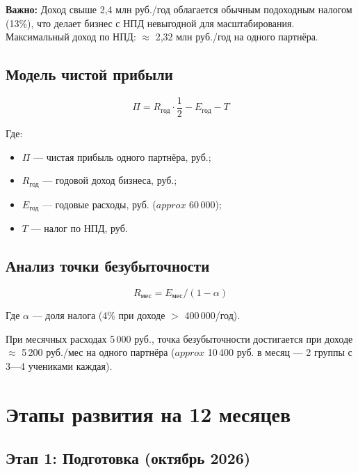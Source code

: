 \documentclass[12pt,a4paper]{article}
\begin{document}
\textbf{Важно:} Доход свыше 2,4 млн руб./год облагается обычным подоходным налогом (13\%), что делает бизнес с НПД невыгодной для масштабирования. Максимальный доход по НПД: ${\approx}$ 2,32 млн руб./год на одного партнёра.

\subsection{Модель чистой прибыли}

\begin{equation}
\Pi = R_{\text{год}} \cdot \frac{1}{2} - E_{\text{год}} - T
\label{eq:net_profit}
\end{equation}

Где:
\begin{itemize}
  \item $\Pi$ --- чистая прибыль одного партнёра, руб.;
  \item $R_{\text{год}}$ --- годовой доход бизнеса, руб.;
  \item $E_{\text{год}}$ --- годовые расходы, руб. (${approx}$ 60\,000);
  \item $T$ --- налог по НПД, руб.
\end{itemize}

\subsection{Анализ точки безубыточности}

\begin{equation}
R_{\text{мес}} = E_{\text{мес}} / (1 - \alpha)
\end{equation}

Где $\alpha$ --- доля налога (4\% при доходе ${>}$ 400\,000/год).

При месячных расходах 5\,000 руб., точка безубыточности достигается при доходе ${\approx}$ 5\,200 руб./мес на одного партнёра (${approx}$ 10\,400 руб. в месяц — 2 группы с 3---4 учениками каждая).

\section{Этапы развития на 12 месяцев}

\subsection{Этап 1: Подготовка (октябрь 2026)}
\end{document}
